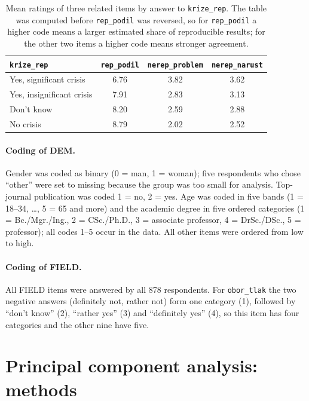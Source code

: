 \documentclass[11pt,a4paper]{article}
\newcommand{\var}[1]{\texttt{#1}}
\begin{document}
\begin{table}[ht]
\centering
\small
\begin{tabular}{@{}l c c c@{}}
\toprule
\var{krize\_rep} & \var{rep\_podil} & \var{nerep\_problem} & \var{nerep\_narust}\\
\midrule
Yes, significant crisis   & 6.76 & 3.82 & 3.62\\
Yes, insignificant crisis & 7.91 & 2.83 & 3.13\\
Don't know                & 8.20 & 2.59 & 2.88\\
No crisis                 & 8.79 & 2.02 & 2.52\\
\bottomrule
\end{tabular}
\caption{Mean ratings of three related items by answer to \var{krize\_rep}. The table was computed before \var{rep\_podil} was reversed, so for \var{rep\_podil} a higher code means a larger estimated share of reproducible results; for the other two items a higher code means stronger agreement.}
\label{tab:dontknow}
\end{table}

\paragraph{Coding of DEM.}
Gender was coded as binary (0 = man, 1 = woman); five respondents who chose ``other'' were set to missing because the group was too small for analysis. Top-journal publication was coded 1 = no, 2 = yes. Age was coded in five bands (1 = 18--34, \dots, 5 = 65 and more) and the academic degree in five ordered categories (1 = Bc./Mgr./Ing., 2 = CSc./Ph.D., 3 = associate professor, 4 = DrSc./DSc., 5 = professor); all codes 1--5 occur in the data. All other items were ordered from low to high.

\paragraph{Coding of FIELD.}
All FIELD items were answered by all 878 respondents. For \var{obor\_tlak} the two negative answers (definitely not, rather not) form one category (1), followed by ``don't know'' (2), ``rather yes'' (3) and ``definitely yes'' (4), so this item has four categories and the other nine have five.

\section{Principal component analysis: methods}
\end{document}
